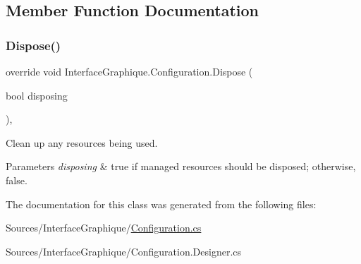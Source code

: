 \subsection{Member Function Documentation}
\hypertarget{class_interface_graphique_1_1_configuration_a0200b084946b5710be7d94f9e8b0385c}{}\label{class_interface_graphique_1_1_configuration_a0200b084946b5710be7d94f9e8b0385c} 
\subsubsection{\texorpdfstring{Dispose()}{Dispose()}}
{\footnotesize\ttfamily override void Interface\+Graphique.\+Configuration.\+Dispose (\begin{DoxyParamCaption}\item[{bool}]{disposing }\end{DoxyParamCaption})\hspace{0.3cm}{\ttfamily [inline]}, {\ttfamily [protected]}}



Clean up any resources being used. 


\begin{DoxyParams}{Parameters}
{\em disposing} & true if managed resources should be disposed; otherwise, false.\\
\hline
\end{DoxyParams}


The documentation for this class was generated from the following files\+:\begin{DoxyCompactItemize}
\item 
Sources/\+Interface\+Graphique/\hyperlink{_configuration_8cs}{Configuration.\+cs}\item 
Sources/\+Interface\+Graphique/Configuration.\+Designer.\+cs\end{DoxyCompactItemize}
